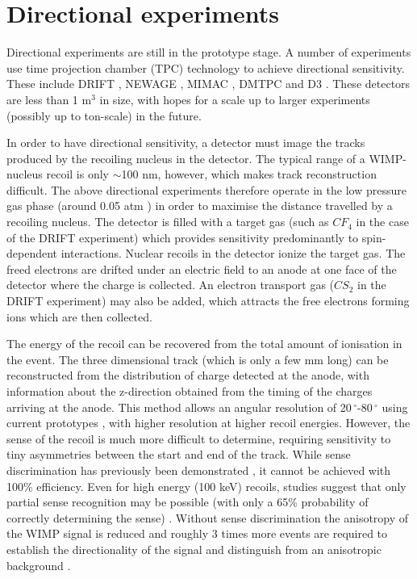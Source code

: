 \section{Directional experiments}
\label{sec:directional:experiments}

Directional experiments are still in the prototype stage. A number of experiments use time projection chamber (TPC) technology to achieve directional sensitivity. These include DRIFT \cite{Daw:2011,Daw:2012}, NEWAGE \cite{Miuchi:2010,Miuchi:2012}, MIMAC \cite{Riffard:2013, Santos:2013}, DMTPC \cite{Monroe:2012,Battat:2013} and D3 \cite{Vahsen:2012}. These detectors are less than 1 $\textrm{m}^3$ in size, with hopes for a scale up to larger experiments (possibly up to ton-scale) in the future.

In order to have directional sensitivity, a detector must image the tracks produced by the recoiling nucleus in the detector. The typical range of a WIMP-nucleus recoil is only $\sim$100 nm, however, which makes track reconstruction difficult. The above directional experiments therefore operate in the low pressure gas phase (around 0.05 atm \cite{Daw:2012}) in order to maximise the distance travelled by a recoiling nucleus. The detector is filled with a target gas (such as $CF_4$ in the case of the DRIFT experiment) which provides sensitivity predominantly to spin-dependent interactions. Nuclear recoils in the detector ionize the target gas. The freed electrons are drifted under an electric field to an anode at one face of the detector where the charge is collected. An electron transport gas ($CS_2$ in the DRIFT experiment) may also be added, which attracts the free electrons forming ions which are then collected.

The energy of the recoil can be recovered from the total amount of ionisation in the event. The three dimensional track (which is only a few mm long) can be reconstructed from the distribution of charge detected at the anode, with information about the z-direction obtained from the timing of the charges arriving at the anode. This method allows an angular resolution of 20$\,^{\circ}$-80$\,^{\circ}$ using current prototypes \cite{Billard:2012}, with higher resolution at higher recoil energies. However, the sense of the recoil is much more difficult to determine, requiring sensitivity to tiny asymmetries between the start and end of the track. While sense discrimination has previously been demonstrated \cite{Burgos:2008}, it cannot be achieved with 100\% efficiency. Even for high energy (100 keV) recoils, studies suggest that only partial sense recognition may be possible (with only a 65\% probability of correctly determining the sense) \cite{Billard:2012}. Without sense discrimination the anisotropy of the WIMP signal is reduced and roughly 3 times more events are required to establish the directionality of the signal and distinguish from an anisotropic background \cite{Morgan:2005,Green:2008}.


